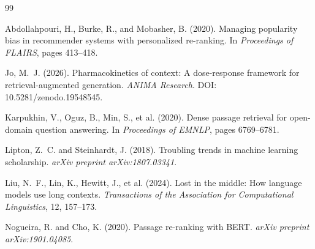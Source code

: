 \documentclass[11pt,a4paper]{article}
\begin{document}

\begin{thebibliography}{99}

Abdollahpouri, H., Burke, R., and Mobasher, B. (2020).
\newblock Managing popularity bias in recommender systems with personalized re-ranking.
\newblock In \emph{Proceedings of FLAIRS}, pages 413--418.

Jo, M.~J. (2026).
\newblock Pharmacokinetics of context: A dose-response framework for retrieval-augmented generation.
\newblock \emph{ANIMA Research}. DOI: 10.5281/zenodo.19548545.

Karpukhin, V., Oguz, B., Min, S., et al. (2020).
\newblock Dense passage retrieval for open-domain question answering.
\newblock In \emph{Proceedings of EMNLP}, pages 6769--6781.

Lipton, Z.~C. and Steinhardt, J. (2018).
\newblock Troubling trends in machine learning scholarship.
\newblock \emph{arXiv preprint arXiv:1807.03341}.

Liu, N.~F., Lin, K., Hewitt, J., et al. (2024).
\newblock Lost in the middle: How language models use long contexts.
\newblock \emph{Transactions of the Association for Computational Linguistics}, 12, 157--173.

Nogueira, R. and Cho, K. (2020).
\newblock Passage re-ranking with {BERT}.
\newblock \emph{arXiv preprint arXiv:1901.04085}.

\end{thebibliography}
\end{document}
